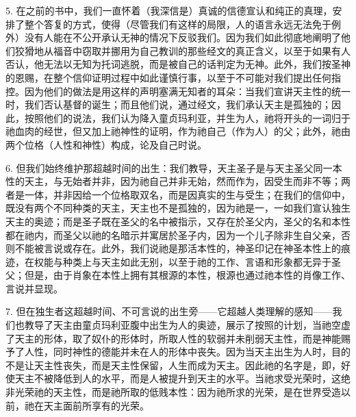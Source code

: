 5. 在之前的书中，我们一直怀着（我深信是）真诚的信德宣认和纯正的真理，安排了整个答复的方式，使得（尽管我们有这样的局限，人的语言永远无法免于例外）没有人能在不公开承认无神的情况下反驳我们。因为我们如此彻底地阐明了他们狡猾地从福音中窃取并挪用为自己教训的那些经文的真正含义，以至于如果有人否认，他无法以无知为托词逃脱，而是被自己的话判定为无神。此外，我们按圣神的恩赐，在整个信仰证明过程中如此谨慎行事，以至于不可能对我们提出任何指控。因为他们的做法是用这样的声明塞满无知者的耳朵：当我们宣讲天主性的统一时，我们否认基督的诞生；而且他们说，通过经文，我们承认天主是孤独的；因此，按照他们的说法，我们认为降入童贞玛利亚，并生为人，祂将开头的一词归于祂血肉的经世，但又加上祂神性的证明，作为祂自己（作为人）的父；此外，祂由两个位格（人性和神性）构成，论及自己时说。\par

6. 但我们始终维护那超越时间的出生：我们教导，天主圣子是与天主圣父同一本性的天主，与无始者并非，因为祂自己并非无始，然而作为，因受生而非不等；两者是一体，并非因给一个位格取双名，而是因真实的生与受生；在我们的信仰中，既没有两个不同种类的天主，天主也不是孤独的，因为祂是一，一如我们宣认独生天主的奥迹；而是圣子既在圣父的名中被指示，又存在於圣父内，圣父的名和本性都在祂内，而圣父以祂的名暗示并寓居於圣子内，因为一个儿子除非生自父亲，否则不能被言说或存在。此外，我们说祂是那活本性的，神圣印记在神圣本性上的痕迹，在权能与种类上与天主如此无别，以至于祂的工作、言语和形象都无异于圣父；但是，由于肖象在本性上拥有其根源的本性，根源也通过祂本性的肖像工作、言说并显现。\par

7. 但在独生者这超越时间、不可言说的出生旁——它超越人类理解的感知——我们也教导了天主由童贞玛利亚腹中出生为人的奥迹，展示了按照的计划，当祂空虚了天主的形体，取了奴仆的形体时，所取人性的软弱并未削弱天主性，而是神能赐予了人性，同时神性的德能并未在人的形体中丧失。因为当天主出生为人时，目的不是让天主性丧失，而是天主性保留，人生而成为天主。因此祂的名字是，即，好使天主不被降低到人的水平，而是人被提升到天主的水平。当祂求受光荣时，这绝非光荣祂的天主性，而是祂所取的低贱本性：因为祂所求的光荣，是在世界受造以前，祂在天主面前所享有的光荣。\par

